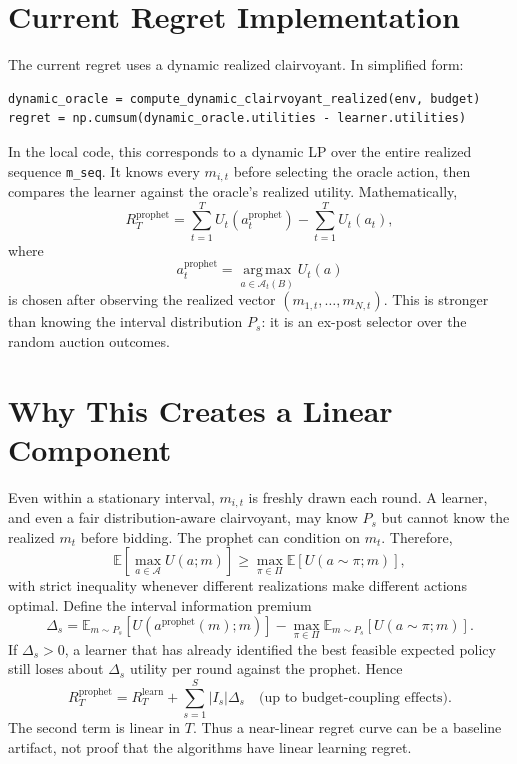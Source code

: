 \documentclass[10pt,a4paper]{article}
\newcommand{\E}{\mathbb{E}}
\newcommand{\1}{\mathbf{1}}
\newcommand{\argmax}{\operatorname*{arg\,max}}
\begin{document}
\section{Current Regret Implementation}
The current regret uses a dynamic realized clairvoyant. In simplified form:
\begin{lstlisting}[style=pythoncompact]
dynamic_oracle = compute_dynamic_clairvoyant_realized(env, budget)
regret = np.cumsum(dynamic_oracle.utilities - learner.utilities)
\end{lstlisting}
In the local code, this corresponds to a dynamic LP over the entire realized sequence \texttt{m\_seq}. It knows every $m_{i,t}$ before selecting the oracle action, then compares the learner against the oracle's realized utility. Mathematically,
\[
  R_T^{\mathrm{prophet}}
  =
  \sum_{t=1}^T U_t(a_t^{\mathrm{prophet}})
  -
  \sum_{t=1}^T U_t(a_t),
\]
where
\[
  a_t^{\mathrm{prophet}}
  =
  \argmax_{a\in\mathcal A_t(B)} U_t(a)
\]
is chosen after observing the realized vector $(m_{1,t},\ldots,m_{N,t})$. This is stronger than knowing the interval distribution $P_s$: it is an ex-post selector over the random auction outcomes.

\section{Why This Creates a Linear Component}
Even within a stationary interval, $m_{i,t}$ is freshly drawn each round. A learner, and even a fair distribution-aware clairvoyant, may know $P_s$ but cannot know the realized $m_t$ before bidding. The prophet can condition on $m_t$. Therefore,
\[
  \E\!\left[\max_{a\in\mathcal A} U(a;m)\right]
  \ge
  \max_{\pi\in\Pi}\E\!\left[U(a\sim\pi;m)\right],
\]
with strict inequality whenever different realizations make different actions optimal. Define the interval information premium
\[
\Delta_s=
\E_{m\sim P_s}[U(a^{\mathrm{prophet}}(m);m)]
-
\max_{\pi\in\Pi}\E_{m\sim P_s}[U(a\sim\pi;m)] .
\]
If $\Delta_s>0$, a learner that has already identified the best feasible expected policy still loses about $\Delta_s$ utility per round against the prophet. Hence
\[
  R_T^{\mathrm{prophet}}
  =
  R_T^{\mathrm{learn}}
  +
  \sum_{s=1}^S |I_s|\Delta_s
  \quad
  \text{(up to budget-coupling effects).}
\]
The second term is linear in $T$. Thus a near-linear regret curve can be a baseline artifact, not proof that the algorithms have linear learning regret.
\end{document}
